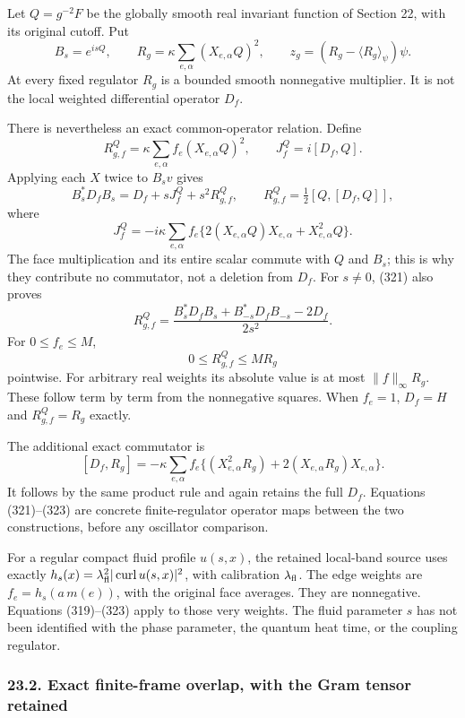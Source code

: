 \documentclass[
  11pt,
]{article}
\begin{document}
Let \(Q=g^{-2}F\) be the globally smooth real invariant function of
Section 22, with its original cutoff. Put \[
 B_s=e^{isQ},\qquad
 R_g=\kappa\sum_{e,\alpha}(X_{e,\alpha}Q)^2,\qquad
 z_g=(R_g-\langle R_g\rangle_\psi)\psi.
 \tag{320}
\] At every fixed regulator \(R_g\) is a bounded smooth nonnegative
multiplier. It is not the local weighted differential operator \(D_f\).

There is nevertheless an exact common-operator relation. Define \[
 R_{g,f}^{Q}=\kappa\sum_{e,\alpha}f_e(X_{e,\alpha}Q)^2,\qquad
 J_f^Q=i[D_f,Q].
\] Applying each \(X\) twice to \(B_s v\) gives \[
 B_s^*D_fB_s=D_f+sJ_f^Q+s^2R_{g,f}^{Q},\qquad
 R_{g,f}^{Q}=\tfrac12[Q,[D_f,Q]],
 \tag{321}
\] where \[
 J_f^Q=-i\kappa\sum_{e,\alpha}f_e
 \{2(X_{e,\alpha}Q)X_{e,\alpha}+X_{e,\alpha}^2Q\}.
\] The face multiplication and its entire scalar commute with \(Q\) and
\(B_s\); this is why they contribute no commutator, not a deletion from
\(D_f\). For \(s\ne0\), (321) also proves \[
 R_{g,f}^{Q}
 =\frac{B_s^*D_fB_s+B_{-s}^*D_fB_{-s}-2D_f}{2s^2}.
 \tag{322}
\] For \(0\le f_e\le M\), \[
 0\le R_{g,f}^{Q}\le M R_g
\] pointwise. For arbitrary real weights its absolute value is at most
\(\|f\|_\infty R_g\). These follow term by term from the nonnegative
squares. When \(f_e=1\), \(D_f=H\) and \(R_{g,f}^{Q}=R_g\) exactly.

The additional exact commutator is \[
 [D_f,R_g]=-\kappa\sum_{e,\alpha}f_e
 \{(X_{e,\alpha}^2R_g)+2(X_{e,\alpha}R_g)X_{e,\alpha}\}.
 \tag{323}
\] It follows by the same product rule and again retains the full
\(D_f\). Equations (321)--(323) are concrete finite-regulator operator
maps between the two constructions, before any oscillator comparison.

For a regular compact fluid profile \(u(s,x)\), the retained local-band
source uses exactly
\(h_s(x)=\lambda_{\rm fl}^2|\operatorname{curl}u(s,x)|^2\), with
calibration \(\lambda_{\rm fl}\). The edge weights are
\(f_e=h_s(a\,m(e))\), with the original face averages. They are
nonnegative. Equations (319)--(323) apply to those very weights. The
fluid parameter \(s\) has not been identified with the phase parameter,
the quantum heat time, or the coupling regulator.

\subsubsection{23.2. Exact finite-frame overlap, with the Gram tensor
retained}\label{exact-finite-frame-overlap-with-the-gram-tensor-retained}
\end{document}
